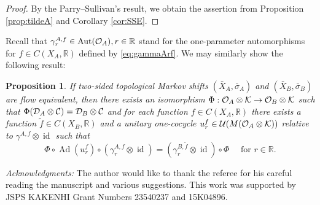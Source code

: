 \documentclass[11pt]{article}
\newtheorem{proposition}[theorem]{Proposition}
\theoremstyle{plain}
\theoremstyle{definition}
\numberwithin{equation}{section}
\newcommand{\id}{\operatorname{id}}
\newcommand{\Ad}{\operatorname{Ad}}
\newcommand{\R}{\mathbb{R}}
\begin{document}
\begin{proof}
By the Parry--Sullivan's result,
we obtain the  assertion  from 
Proposition \ref{prop:tildeA} and
Corollary \ref{cor:SSE}.
\end{proof}
Recall that 
$\gamma^{A,f}_r \in \Aut(\OA), r \in \R$ 
stand for the one-parameter 
automorphisms for 
$f \in C(X_A,\R)$ 
defined by \eqref{eq:gammaArf}. 
We may similarly show the following result:
\begin{proposition}\label{prop:FETFAER}
If two-sided topological Markov shifts
$(\bar{X}_A, \bar{\sigma}_A)$ and $(\bar{X}_B,\bar{\sigma}_B)$
are flow equivalent, 
then there exists an isomorphism
$\Phi:{{\mathcal{O}}_A}\otimes{\mathcal{K}} \rightarrow {{\mathcal{O}}_B}\otimes{\mathcal{K}}$ such that 
$\Phi({{\mathcal{D}}_A}\otimes{\mathcal{C}}) = {{\mathcal{D}}_B}\otimes{\mathcal{C}}$
and for each function
$f\in C(X_A,\R)$
there exists
a function
$\tilde{f}\in C(X_B,\R)$
and a unitary one-cocycle
 $u_r^f \in {{\mathcal{U}}}(M({{\mathcal{O}}_A}\otimes{\mathcal{K}}))$ relative to 
$\gamma^{A,f} \otimes\id$
such that 
\begin{equation*}
\Phi \circ \Ad(u_r^f) \circ (\gamma^{A,f}_r\otimes \id)
 = (\gamma^{B,\tilde{f}}_r\otimes\id) \circ \Phi
\quad
\text{ for }
 r \in \R.
\end{equation*}
\end{proposition}


{\it Acknowledgments:}
The author would like to thank the referee for his careful reading the manuscript
and various suggestions. 
This work was supported by JSPS KAKENHI Grant Numbers 
23540237 and 15K04896.




\end{document}
